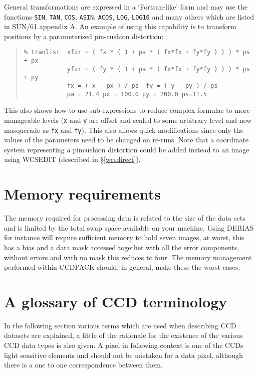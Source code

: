\documentclass[twoside,11pt]{article}
\newcommand{\hyperref}[4]{#2\ref{#4}#3}
\newcommand{\htmlref}[2]{#1}
\newcommand{\xlabel}[1]{}
\renewcommand{\_}{\texttt{\symbol{95}}}
\newenvironment{myquote}{\begin{quote}\begin{small}}{\end{small}\end{quote}}
\newcommand{\text}[1]{{\small \tt #1}}
\newcommand{\xroutine}[1]{\htmlref{{\sc #1}}{#1}}
\begin{document}
General transformations are expressed in a `Fortran-like' form and may
use the functions \text{SIN}, \text{TAN}, \text{COS},
\text{ASIN},
\text{ACOS}, \text{LOG}, \text{LOG10} and many others  which are
listed in SUN/61 appendix A. An example of using this capability is to
transform positions by a parameterised pin-cushion distortion:
\begin{myquote}
\begin{verbatim}
% tranlist  xfor = ( fx * ( 1 + pa * ( fx*fx + fy*fy ) ) ) * ps + px
            yfor = ( fy * ( 1 + pa * ( fx*fx + fy*fy ) ) ) * ps + py
            fx = ( x - px ) / ps  fy = ( y - py ) / ps
            pa = 21.4 px = 100.0 py = 200.0 ps=11.5
\end{verbatim}
\end{myquote}
This also shows how to use sub-expressions to reduce complex formulae to
more manageable levels (\text{x} and \text{y} are offset and scaled
to some arbitrary level and now masquerade as \text{fx} and
\text{fy}). This also allows quick modifications since only the values
of the parameters need to be changed on re-runs.
Note that a coordinate system representing a pincushion distortion 
could be added instead to an image using \xroutine{WCSEDIT} 
(described \hyperref{elsewhere}{in \S}{}{wcsdirect}).



\newpage
\section{Memory requirements}
The memory required for processing data is related to the size of the
data sets and is limited by the total swap space available on your
machine. Using \xroutine{DEBIAS} for instance will require sufficient
memory to hold seven images, at worst, this has a bias and a data mask
accessed together with all the error components, without errors and with
no mask this reduces to four.  The memory management performed within
CCDPACK should, in general, make these the worst cases.

\section{A glossary of CCD terminology \xlabel{glossary} \label{app:glos}}
\label{donothing}
In the following section various terms which are used when describing
CCD datasets are explained, a little of the rationale for the
existence of the various CCD data types is also given. A pixel in
following context is one of the CCDs light sensitive elements and
should not be mistaken for a data pixel, although there is a one to
one correspondence between them.
\end{document}
